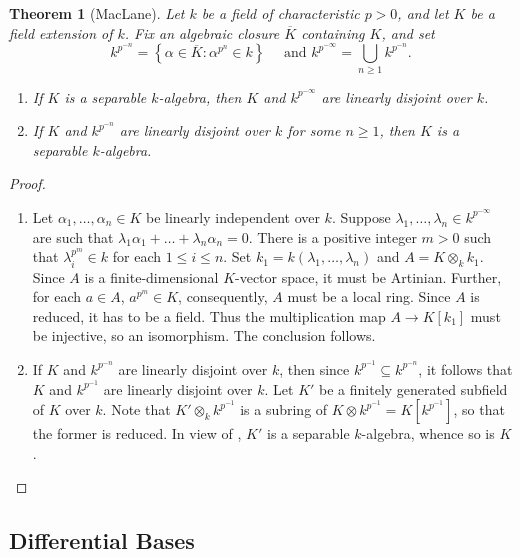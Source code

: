 \documentclass[10pt]{article}
\theoremstyle{thmstyle}
\newtheorem{theorem}{Theorem}[section]
\theoremstyle{defstyle}
\renewcommand{\le}{\leqslant}
\renewcommand{\ge}{\geqslant}
\begin{document}
\begin{theorem}[MacLane]
    Let $k$ be a field of characteristic $p > 0$, and let $K$ be a field extension of $k$. Fix an algebraic closure $\overline K$ containing $K$, and set 
    \begin{equation*}
        k^{p^{-n}} = \left\{\alpha\in\overline K\colon \alpha^{p^n}\in k\right\}\quad\text{ and } k^{p^{-\infty}} = \bigcup_{n\ge 1} k^{p^{-n}}.
    \end{equation*}
    \begin{enumerate}[label=(\arabic*)]
        \item If $K$ is a separable $k$-algebra, then $K$ and $k^{p^{-\infty}}$ are linearly disjoint over $k$. 
        \item If $K$ and $k^{p^{-n}}$ are linearly disjoint over $k$ for some $n\ge 1$, then $K$ is a separable $k$-algebra.
    \end{enumerate}
\end{theorem}
\begin{proof}
\begin{enumerate}[label=(\arabic*)]
    \item Let $\alpha_1,\dots,\alpha_n\in K$ be linearly independent over $k$. Suppose $\lambda_1,\dots,\lambda_n\in k^{p^{-\infty}}$ are such that $\lambda_1\alpha_1 + \dots + \lambda_n\alpha_n = 0$. There is a positive integer $m > 0$ such that $\lambda_i^{p^m}\in k$ for each $1\le i\le n$. Set $k_1 = k(\lambda_1,\dots,\lambda_n)$ and $A = K\otimes_k k_1$. Since $A$ is a finite-dimensional $K$-vector space, it must be Artinian. Further, for each $a\in A$, $a^{p^m}\in K$, consequently, $A$ must be a local ring. Since $A$ is reduced, it has to be a field. Thus the multiplication map $A\to K[k_1]$ must be injective, so an isomorphism. The conclusion follows. 
    \item If $K$ and $k^{p^{-n}}$ are linearly disjoint over $k$, then since $k^{p^{-1}}\subseteq k^{p^{-n}}$, it follows that $K$ and $k^{p^{-1}}$ are linearly disjoint over $k$. Let $K'$ be a finitely generated subfield of $K$ over $k$. Note that $K'\otimes_k k^{p^{-1}}$ is a subring of $K\otimes k^{p^{-1}} = K[k^{p^{-1}}]$, so that the former is reduced. In view of , $K'$ is a separable $k$-algebra, whence so is $K$. \qedhere
\end{enumerate}
\end{proof}

\subsection{Differential Bases}



\end{document}

